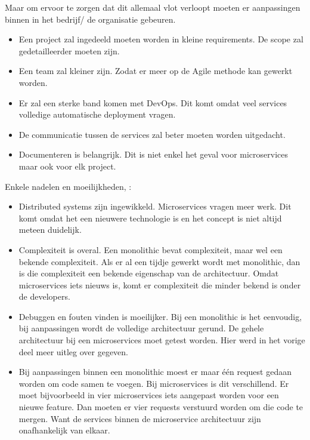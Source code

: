 Maar om ervoor te zorgen dat dit allemaal vlot verloopt moeten er aanpassingen binnen in het bedrijf/ de organisatie gebeuren. 
\begin{itemize}
	\item Een project zal ingedeeld moeten worden in kleine requirements. De scope zal gedetailleerder moeten zijn.
	\item Een team zal kleiner zijn. Zodat er meer op de Agile methode kan gewerkt worden.
	\item Er zal een sterke band komen met DevOps. Dit komt omdat veel services volledige automatische deployment vragen.
	\item De communicatie tussen de services zal beter moeten worden uitgedacht.
	\item Documenteren is belangrijk. Dit is niet enkel het geval voor microservices maar ook voor elk project.
\end{itemize}

Enkele nadelen en moeilijkheden, \textcite{Koukia2018}:
\begin{itemize}
	\item Distributed systems zijn ingewikkeld. Microservices vragen meer  werk. Dit komt omdat het een nieuwere technologie is en het concept is niet altijd meteen duidelijk. 
	\item Complexiteit is overal. Een monolithic bevat complexiteit, maar  wel een bekende complexiteit. Als er al een tijdje gewerkt wordt met monolithic, dan is die complexiteit een bekende eigenschap van de architectuur. Omdat microservices iets nieuws is, komt er complexiteit die minder bekend is onder de developers.
	\item Debuggen en fouten vinden is moeilijker. Bij een monolithic is het eenvoudig, bij aanpassingen wordt de volledige architectuur gerund. De gehele architectuur bij een microservices moet getest worden. Hier werd in het vorige deel meer uitleg over gegeven.
	\item Bij aanpassingen binnen een monolithic moest er maar één request gedaan worden om code samen te voegen. Bij microservices is dit verschillend. Er moet bijvoorbeeld in vier microservices iets aangepast worden voor een nieuwe  feature. Dan moeten er vier requests verstuurd worden om die code te mergen. Want de services binnen de microservice architectuur zijn onafhankelijk van elkaar. 
\end{itemize}

